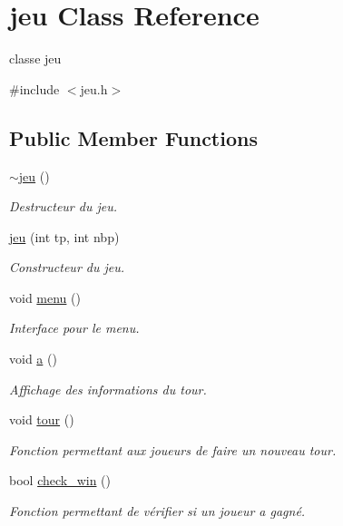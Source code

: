 \hypertarget{classjeu}{}\section{jeu Class Reference}
\label{classjeu}


classe jeu  




{\ttfamily \#include $<$jeu.\+h$>$}

\subsection*{Public Member Functions}
\begin{DoxyCompactItemize}
\item 
\hyperlink{classjeu_a55385a33ef40e0579eb3a3634566c4a8}{$\sim$jeu} ()
\begin{DoxyCompactList}\small\item\em Destructeur du jeu. \end{DoxyCompactList}\item 
\hyperlink{classjeu_abc0e1ad9a05d57a06de111e9ccb3f8b9}{jeu} (int tp, int nbp)
\begin{DoxyCompactList}\small\item\em Constructeur du jeu. \end{DoxyCompactList}\item 
void \hyperlink{classjeu_a5b18141ecb3ed6cad4e8116e8248b461}{menu} ()
\begin{DoxyCompactList}\small\item\em Interface pour le menu. \end{DoxyCompactList}\item 
void \hyperlink{classjeu_a044947660d0990bd6869d3669306ba8c}{a} ()
\begin{DoxyCompactList}\small\item\em Affichage des informations du tour. \end{DoxyCompactList}\item 
void \hyperlink{classjeu_ac71ae1e00668be38e0e9b1e2f890639d}{tour} ()
\begin{DoxyCompactList}\small\item\em Fonction permettant aux joueurs de faire un nouveau tour. \end{DoxyCompactList}\item 
bool \hyperlink{classjeu_a7da98d2c8eaccacc01abb6d25777a7a0}{check\+\_\+win} ()
\begin{DoxyCompactList}\small\item\em Fonction permettant de vérifier si un joueur a gagné. \end{DoxyCompactList}\end{DoxyCompactItemize}

